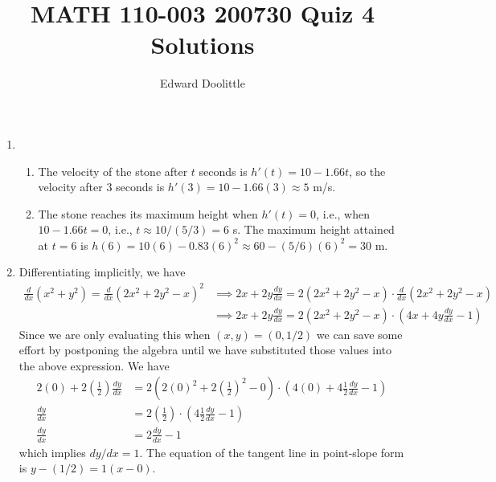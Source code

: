 \documentclass[12pt]{article}
\title{MATH 110-003 200730 Quiz 4 Solutions}
\author{Edward Doolittle}
\begin{document}
\maketitle

\begin{enumerate}
\item 
  \begin{enumerate}
  \item The velocity of the stone after $t$ seconds is $h'(t)=10-1.66 t$,
    so the velocity after $3$ seconds is $h'(3)=10-1.66(3)\approx 5$ m/s.
  \item The stone reaches its maximum height when $h'(t)=0$, i.e., when
    $10-1.66 t=0$, i.e., $t\approx 10/(5/3) = 6$ s.  The maximum height
    attained at $t=6$ is $h(6)=10(6)-0.83(6)^2\approx 60-(5/6)(6)^2=30$ m.
  \end{enumerate}
\item Differentiating implicitly, we have
  \begin{align*}
    \frac{d}{dx} (x^2+y^2) = \frac{d}{dx} (2x^2+2y^2-x)^2
    &\implies
    2x + 2y \frac{dy}{dx} = 2(2x^2+2y^2-x) \cdot \frac{d}{dx}(2x^2+2y^2-x)
    \\
    &\implies
    2x + 2y \frac{dy}{dx} = 2(2x^2+2y^2-x) \cdot 
    \left(4x + 4y \frac{dy}{dx} - 1\right)
  \end{align*}
  Since we are only evaluating this when $(x,y)=(0,1/2)$ we can save some
  effort by postponing the algebra until we have substituted those
  values into the above expression.  We have
  \begin{align*}
    2(0) + 2\left(\frac{1}{2}\right) \frac{dy}{dx}
    &= 2(2(0)^2 + 2\left(\frac{1}{2}\right)^2 - 0) \cdot 
    \left(4(0) + 4\frac{1}{2} \frac{dy}{dx} - 1\right)
    \\
    \frac{dy}{dx} &= 2\left(\frac{1}{2}\right) \cdot \left(4\frac{1}{2}
      \frac{dy}{dx} -1\right)
    \\
    \frac{dy}{dx} &= 2 \frac{dy}{dx} - 1
  \end{align*}
  which implies $dy/dx = 1$.
  The equation of the tangent line in point-slope form is
  $y-(1/2) = 1(x-0)$.
\end{enumerate}
\end{document}
